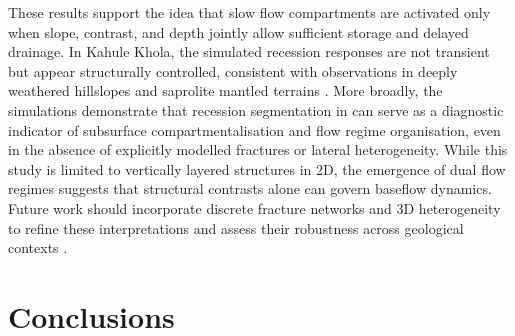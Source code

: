 \documentclass[hess, manuscript]{copernicus}
\begin{document}
These results support the idea that slow flow compartments are activated only when slope, contrast, and depth jointly allow sufficient storage and delayed drainage. In Kahule Khola, the simulated recession responses are not transient but appear structurally controlled, consistent with observations in deeply weathered hillslopes and saprolite mantled terrains \citep{rempe-2018,dralle-etal-2023}. More broadly, the simulations demonstrate that recession segmentation in can serve as a diagnostic indicator of subsurface compartmentalisation and flow regime organisation, even in the absence of explicitly modelled fractures or lateral heterogeneity. While this study is limited to vertically layered structures in 2D, the emergence of dual flow regimes suggests that structural contrasts alone can govern baseflow dynamics. Future work should incorporate discrete fracture networks and 3D heterogeneity to refine these interpretations and assess their robustness across geological contexts \citep{klos-etal-2018,carroll-etal-2025}.

\section{Conclusions}




\end{document}

